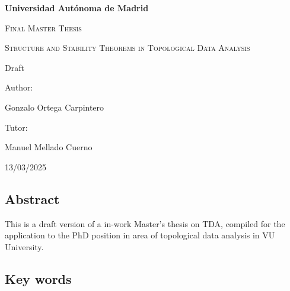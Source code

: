 \documentclass[12pt, twoside]{report}
\theoremstyle{definition}
\newcommand{\authorname}{Gonzalo Ortega Carpintero}
\newcommand{\tutorname}{Manuel Mellado Cuerno}
\newcommand{\institution}{Universidad Autónoma de Madrid}
\newcommand{\projecttitle}{Structure and Stability Theorems in Topological Data Analysis

Draft}
\begin{document}
\pagestyle{fancy}
\renewcommand{\chaptermark}[1]{\markboth{Chapter \thechapter.\ #1}{}}
\fancyhf{}
\fancyhead[LO]{\thepage}
\fancyhead[RO]{\leftmark}
\fancyhead[RE]{\thepage}
\fancyhead[LE]{\nouppercase\rightmark}
\fancyfoot[C]{}
\setlength{\headsep}{30pt}
\setlength{\headheight}{14.5pt}

\begin{titlepage}
    \centering
    \vspace{1cm}
    {\bfseries\LARGE \institution \par}
    \vspace{1cm}
    {\scshape\Large Final Master Thesis \par}
    \vspace{3cm}
    {\scshape\Huge \projecttitle \par}
    \vspace{2cm}
    \vfill
    {\Large Author: \par}
    {\Large \authorname \par}
    \vspace{1cm}
    {\Large Tutor: \par}
    {\Large \tutorname \par}
    \vfill
    {\Large 13/03/2025 \par}
\end{titlepage}

\setlength{\parskip}{0.75em}
\renewcommand{\baselinestretch}{1.25}

\subsection*{Abstract}
This is a draft version of a in-work Master's thesis on TDA, compiled for the application to the PhD position in area of topological data analysis in VU University.

\subsection*{Key words}

\tableofcontents
\newpage

\setcounter{page}{1}










{}


\end{document}
